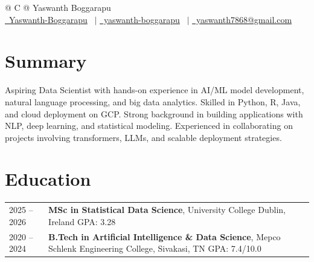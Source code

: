 \documentclass[a4paper,12pt]{article}
\begin{document}
\pagestyle{empty} 

\begin{tabularx}{\linewidth}{@{} C @{} }
\Huge{Yaswanth Boggarapu} \\[7.5pt]
\href{https://github.com/Yaswanth-Boggarapu}{\raisebox{-0.05\height}\faGithub\ Yaswanth-Boggarapu} \ $|$ 
\href{https://linkedin.com/in/yaswanth-boggarapu-a27a5a245}{\raisebox{-0.05\height}\faLinkedin\ yaswanth-boggarapu} \ $|$ 
\href{mailto:yaswanth7868@gmail.com}{\raisebox{-0.05\height}\faEnvelope\ yaswanth7868@gmail.com} \  
\end{tabularx}

\section{Summary}
Aspiring Data Scientist with hands-on experience in AI/ML model development, natural language processing, and big data analytics. Skilled in Python, R, Java, and cloud deployment on GCP. Strong background in building applications with NLP, deep learning, and statistical modeling. Experienced in collaborating on projects involving transformers, LLMs, and scalable deployment strategies.

\section{Education}
\begin{tabularx}{\linewidth}{@{}l X@{}}	
2025 -- 2026 & \textbf{MSc in Statistical Data Science}, University College Dublin, Ireland \hfill GPA: 3.28 \\
2020 -- 2024 & \textbf{B.Tech in Artificial Intelligence \& Data Science}, Mepco Schlenk Engineering College, Sivakasi, TN \hfill GPA: 7.4/10.0 \\
\end{tabularx}
\end{document}
